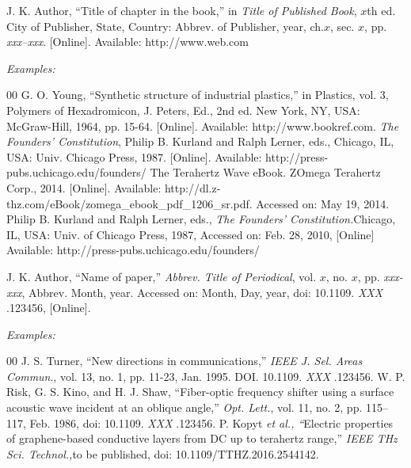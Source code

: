 \documentclass{ieeetmlcn}
\begin{document}
\eject


\noindent J. K. Author, ``Title of chapter in the book,'' in {\it Title of Published Book}, $x$th ed. City of
Publisher, State, Country: Abbrev. of Publisher, year, ch.$x$, sec. $x$, pp.
{\it xxx--xxx}. [Online]. Available:  {http://www.web.com}




{\it Examples:}

\begin{thebibliography}{00}
 G. O. Young, ``Synthetic structure of industrial plastics,'' in Plastics, vol. 3, Polymers of Hexadromicon, J. Peters, Ed., 2nd ed. New York, NY, USA: McGraw-Hill, 1964, pp. 15-64. [Online]. Available:  {http://www.bookref.com}.
 {\it The Founders' Constitution}, Philip B. Kurland and Ralph Lerner, eds., Chicago, IL, USA: Univ. Chicago Press, 1987. [Online]. Available:  {http://press-pubs.uchicago.edu/founders/}
 The Terahertz Wave eBook. ZOmega Terahertz Corp., 2014. [Online]. Available:  {http://dl.z-thz.com/eBook/zomega\_ebook\_pdf\_1206\_sr.pdf}. Accessed on: May 19, 2014.
 Philip B. Kurland and Ralph Lerner, eds., {\it The Founders' Constitution.}Chicago, IL, USA: Univ. of Chicago Press, 1987, Accessed on: Feb. 28, 2010, [Online] Available:  {http://press-pubs.uchicago.edu/founders/}
\end{thebibliography}


\noindent J. K. Author, ``Name of paper,'' {\it Abbrev. Title of Periodical}, vol. $x$, no. $x$, pp. {\it xxx-xxx}, Abbrev. Month, year.
Accessed on: Month, Day, year, doi:  {10.1109.} {{\it
XXX}} {.123456}, [Online].

{\it Examples:}

\begin{thebibliography}{00}
 J. S. Turner, ``New directions in communications,'' {\it IEEE J. Sel. Areas Commun}., vol. 13, no. 1, pp. 11-23, Jan. 1995. DOI.  {10.1109.} {{\it XXX}} {.123456}.
 W. P. Risk, G. S. Kino, and H. J. Shaw, ``Fiber-optic frequency shifter using a surface acoustic wave incident at an oblique angle,'' {\it Opt. Lett.}, vol. 11, no. 2, pp. 115--117, Feb. 1986, doi: {10.1109.} {{\it XXX}} {.123456}.
 P. Kopyt {\it \textit{et al.}, ``}Electric properties of graphene-based conductive layers from DC up to terahertz range,'' {\it IEEE THz Sci. Technol.,}to be published, doi:  {10.1109/TTHZ.2016.2544142}.
\end{thebibliography}
\end{document}
